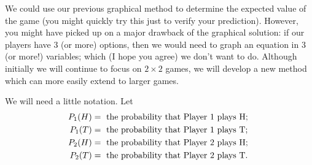 We could use our previous graphical method to determine the expected value of the game (you might quickly try this just to verify your prediction). However, you might have picked up on a major drawback of the graphical solution: if our players have 3 (or more) options, then we would need to graph an equation in 3 (or more!) variables; which (I hope you agree) we don't want to do.  Although initially we will continue to focus on $2 \times 2$ games, we will develop a new method which can more easily extend to larger games. 

We will need a little notation. Let 
\begin{align}
P_1(H) & = \mbox{ the probability that Player 1 plays H; } \notag\\
P_1(T) & = \mbox{ the probability that Player 1 plays T;} \notag \\
P_2(H) & = \mbox{ the probability that Player 2 plays H; } \notag\\
P_2(T) & = \mbox{ the probability that Player 2 plays T.} \notag
\end{align}


